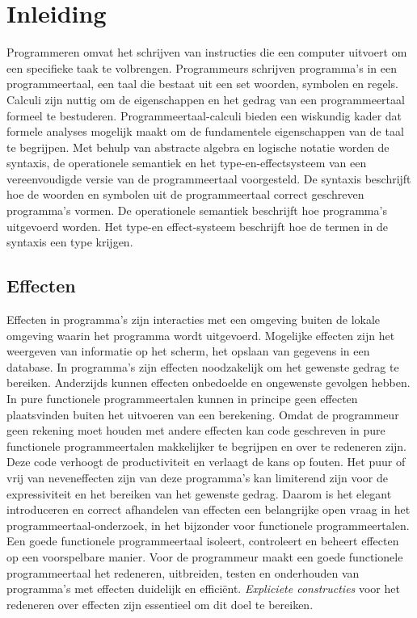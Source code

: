 \chapter{Inleiding} \label{inleiding}
Programmeren omvat het schrijven van instructies die een computer uitvoert om een specifieke taak te volbrengen. Programmeurs schrijven programma's in een programmeertaal, een taal die bestaat uit een set woorden, symbolen en regels. Calculi zijn nuttig om de eigenschappen en het gedrag van een programmeertaal formeel te bestuderen. Programmeertaal-calculi bieden een wiskundig kader dat formele analyses mogelijk maakt om de fundamentele eigenschappen van de taal te begrijpen. Met behulp van abstracte algebra en logische notatie worden de syntaxis, de operationele semantiek en het type-en-effectsysteem van een vereenvoudigde versie van de programmeertaal voorgesteld. De syntaxis beschrijft hoe de woorden en symbolen uit de programmeertaal correct geschreven programma's vormen. De operationele semantiek beschrijft hoe programma's uitgevoerd worden. Het type-en effect-systeem beschrijft hoe de termen in de syntaxis een type krijgen.  

\section{Effecten}
Effecten in programma's zijn interacties met een omgeving buiten de lokale omgeving waarin het programma wordt uitgevoerd. Mogelijke effecten zijn het weergeven van informatie op het scherm, het opslaan van gegevens in een database. In programma's zijn effecten noodzakelijk om het gewenste gedrag te bereiken. Anderzijds kunnen effecten onbedoelde en ongewenste gevolgen hebben. In pure functionele programmeertalen kunnen in principe geen effecten plaatsvinden buiten het uitvoeren van een berekening. Omdat de programmeur geen rekening moet houden met andere effecten kan code geschreven in pure functionele programmeertalen makkelijker te begrijpen en over te redeneren zijn. Deze code verhoogt de productiviteit en verlaagt de kans op fouten. Het puur of vrij van neveneffecten zijn van deze programma's kan limiterend zijn voor de expressiviteit en  het bereiken van het gewenste gedrag. Daarom is het elegant introduceren en correct afhandelen van effecten een belangrijke open vraag in het programmeertaal-onderzoek, in het bijzonder voor functionele programmeertalen. Een goede functionele programmeertaal isoleert, controleert en beheert effecten op een voorspelbare manier. Voor de programmeur maakt een goede functionele programmeertaal het redeneren, uitbreiden, testen en onderhouden van programma's met effecten duidelijk en efficiënt. \emph{Expliciete constructies} voor het redeneren over effecten zijn essentieel om dit doel te bereiken. \newline

